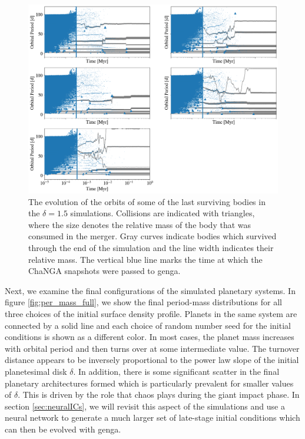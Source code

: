 \begin{figure}
\begin{center}
    \includegraphics[width=\textwidth]{figures/stip/full_coll_evo.png}
    \caption{The evolution of the orbits of some of the last surviving bodies in the $\delta = 1.5$ simulations. Collisions are indicated with  triangles, where the size denotes the relative mass of the body that was consumed in the merger. Gray curves indicate bodies which survived through the end of the simulation and the line width indicates their relative mass. The vertical blue line marks the time at which the {\sc ChaNGA} snapshots were passed to {\sc genga}.\label{fig:full_coll_evo}}
\end{center}
\end{figure}

Next, we examine the final configurations of the simulated planetary systems. In figure \ref{fig:per_mass_full}, we show the final period-mass distributions for all three choices of the initial surface density profile. Planets in the same system are connected by a solid line and each choice of random number seed for the initial conditions is shown as a different color. In most cases, the planet mass increases with orbital period and then turns over at some intermediate value. The turnover distance appears to be inversely proportional to the power law slope of the initial planetesimal disk $\delta$. In addition, there is some significant scatter in the final planetary architectures formed which is particularly prevalent for smaller values of $\delta$. This is driven by the role that chaos plays during the giant impact phase. In section \ref{sec:neuralICs}, we will revisit this aspect of the simulations and use a neural network to generate a much larger set of late-stage initial conditions which can then be evolved with {\sc genga}.

